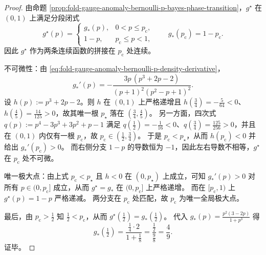 \begin{proof}
由命题 \ref{prop:fold-gauge-anomaly-bernoulli-p-bayes-phase-transition}，\(g^\star\) 在 \((0,1)\) 上满足分段闭式
\[
g^\star(p)=
\begin{cases}
g_\ast(p),& 0<p\le p_{\mathrm c},\\
1-p,& p_{\mathrm c}\le p<1,
\end{cases}
\qquad
g_\ast(p_{\mathrm c})=1-p_{\mathrm c}.
\]
因此 \(g^\star\) 作为两条连续函数的拼接在 \(p_{\mathrm c}\) 处连续。
\par
不可微性：由 \eqref{eq:fold-gauge-anomaly-bernoulli-p-density-derivative}，
\[
g_\ast'(p)= -\frac{3p\,(p^3+2p-2)}{(p+1)^2(p^2-p+1)^2}.
\]
设 \(h(p):=p^3+2p-2\)。则 \(h\) 在 \((0,1)\) 上严格递增且 \(h(\tfrac34)=-\tfrac{5}{64}<0\)、\(h(\tfrac45)=\tfrac{14}{125}>0\)，故其唯一根 \(p_\star\) 落在 \((\tfrac34,\tfrac45)\)。
另一方面，四次式 \(q(p):=p^4-3p^3+3p^2+p-1\) 满足 \(q(\tfrac12)=-\tfrac{1}{16}<0\)、\(q(\tfrac34)=\tfrac{125}{256}>0\)，并且在 \((0,1)\) 内仅有一根 \(p_{\mathrm c}\)，故 \(p_{\mathrm c}\in(\tfrac12,\tfrac34)\)。
于是 \(p_{\mathrm c}<p_\star\)，从而 \(h(p_{\mathrm c})<0\) 并给出 \(g_\ast'(p_{\mathrm c})>0\)。
而右侧分支 \(1-p\) 的导数恒为 \(-1\)，因此左右导数不相等，\(g^\star\) 在 \(p_{\mathrm c}\) 处不可微。
\par
唯一极大点：由上式 \(p_{\mathrm c}<p_\star\) 且 \(h<0\) 在 \((0,p_\star)\) 上成立，可知 \(g_\ast'(p)>0\) 对所有 \(p\in(0,p_{\mathrm c}]\) 成立，从而 \(g^\star=g_\ast\) 在 \((0,p_{\mathrm c}]\) 上严格递增。
而在 \([p_{\mathrm c},1)\) 上 \(g^\star(p)=1-p\) 严格递减。
两分支在 \(p_{\mathrm c}\) 处匹配，故 \(p_{\mathrm c}\) 为唯一全局极大点。
\par
最后，由 \(p_{\mathrm c}>\tfrac12\) 知 \(\tfrac12<p_{\mathrm c}\)，从而 \(g^\star(\tfrac12)=g_\ast(\tfrac12)\)。
代入 \(g_\ast(p)=\frac{p^2(3-2p)}{1+p^3}\) 得
\[
g_\ast\!\left(\tfrac12\right)
=\frac{\tfrac14\cdot 2}{1+\tfrac18}
=\frac{\tfrac12}{\tfrac98}
=\frac49.
\]
证毕。
\end{proof}

\endinput

